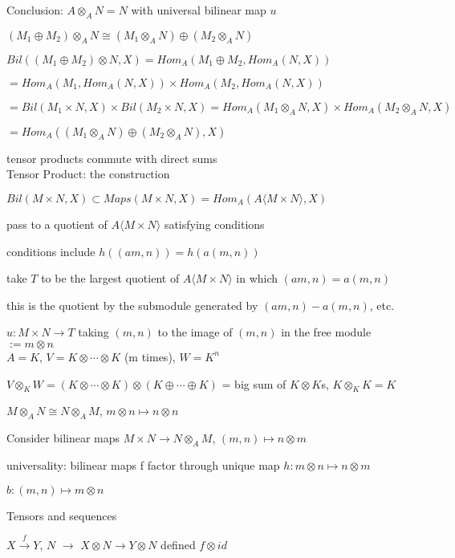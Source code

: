\documentclass[12pt]{article}
\begin{document}
Conclusion: $A \otimes_A N = N$ with universal bilinear map $u$

\noindent
$(M_1 \oplus M_2) \otimes_A N \cong (M_1 \otimes_A N) \oplus (M_2 \otimes_A N)$

$Bil((M_1 \oplus M_2) \otimes N, X) = Hom_A(M_1 \oplus M_2, Hom_A(N, X))$

$= Hom_A(M_1, Hom_A(N, X)) \times Hom_A(M_2, Hom_A(N, X))$

$= Bil(M_1 \times N, X) \times Bil(M_2 \times N, X) = Hom_A(M_1 \otimes_A N, X) \times Hom_A(M_2 \otimes_A N, X)$

$=Hom_A((M_1 \otimes_A N) \oplus (M_2 \otimes_A N), X)$

tensor products commute with direct sums\\

\noindent
Tensor Product: the construction

$Bil(M \times N, X) \subset Maps(M \times N, X) = Hom_A(A\langle M \times N \rangle, X)$

pass to a quotient of $A\langle M \times N \rangle$ satisfying conditions

conditions include $h((am, n)) = h(a(m, n))$

take $T$ to be the largest quotient of $A\langle M \times N\rangle$ in which $(am, n) = a(m, n)$

this is the quotient by the submodule generated by $(am, n) - a(m, n)$, etc.

$u: M \times N \to T$ taking $(m, n)$ to the image of $(m, n)$ in the free module $:= m \otimes n$\\

\noindent
$A = K$, $V = K \otimes \cdots \otimes K$ (m times), $W = K^n$

$V \otimes_K W = (K \otimes \cdots \otimes K) \otimes (K \oplus \cdots \oplus K)$ = big sum of $K \otimes K$s, $K \otimes_K K = K$

\noindent
$M \otimes_A N \cong N \otimes_A M$, $m \otimes n \mapsto n \otimes n$

Consider bilinear maps $M \times N \to N \otimes_A M$, $(m, n) \mapsto n \otimes m$

universality: bilinear maps f factor through unique map $h: m \otimes n \mapsto n \otimes m$

$b: (m, n) \mapsto m \otimes n$ 

\noindent
Tensors and sequences

$X \xrightarrow{f} Y$, $N$ $\to$ $X \otimes N \to Y \otimes N$ defined $f \otimes id$
\end{document}
